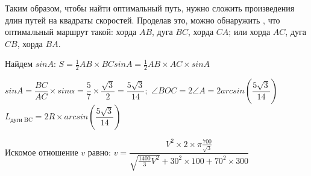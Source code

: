 Таким образом, чтобы найти оптимальный путь, нужно сложить произведения длин путей на квадраты скоростей.  
Проделав это, можно обнаружить , что оптимальный маршрут такой:  хорда $AB$, дуга $BC$, хорда $CA$;  или  хорда  
$AC$, дуга $CB$, хорда $BA$.

Найдем $sinA$:  $S=\frac{1}{2} AB \times BC sinA=\frac{1}{2} AB \times AC \times sinA$

$sinA=\dfrac{BC}{AC} \times sin\alpha =\dfrac{5}{7} \times \dfrac{\sqrt{3}}{2}=\dfrac{5\sqrt{3}}{14};$      $\angle BOC=2\angle A=2arcsin\left(\dfrac{5\sqrt{3}}{14}\right)$
$L_{\text{дуги BC}}=2R \times arcsin\left(\dfrac{5\sqrt{3}}{14}\right) $

Искомое  отношение $v$ равно:     
$v=\dfrac{V^2 \times 2 \times \pi \frac{700}{\sqrt{3}}}{\sqrt{\frac{1400}{3} V^2}+30^2 \times 100+70^2 \times 300}$



